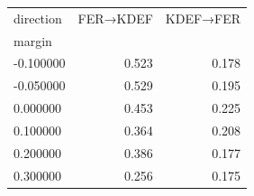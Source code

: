 \begin{tabular}{lrr}
\toprule
direction & FER→KDEF & KDEF→FER \\
margin &  &  \\
\midrule
-0.100000 & 0.523 & 0.178 \\
-0.050000 & 0.529 & 0.195 \\
0.000000 & 0.453 & 0.225 \\
0.100000 & 0.364 & 0.208 \\
0.200000 & 0.386 & 0.177 \\
0.300000 & 0.256 & 0.175 \\
\bottomrule
\end{tabular}
